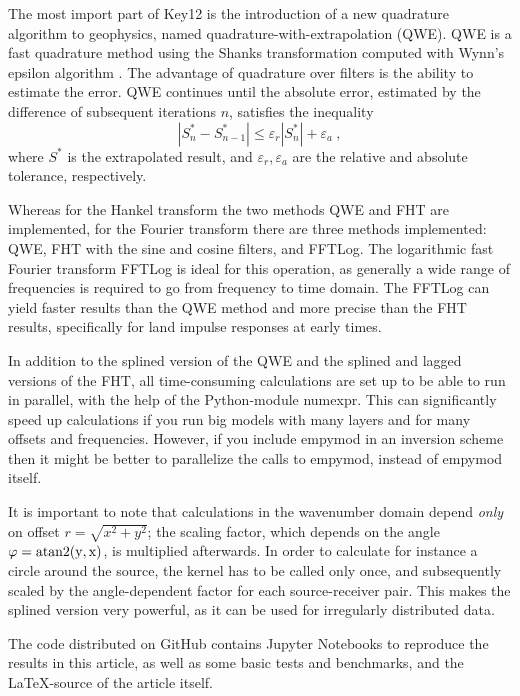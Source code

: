 \documentclass[manuscript]{geophysics}
\newcommand{\tnt}[1]{#1}
\newcommand{\python}{\tnt{Python}\xspace}
\newcommand{\empymod}{\tnt{empymod}\xspace}
\newcommand{\fftlog}{\tnt{FFTLog}\xspace}
\begin{document}
The most import part of Key12 is the introduction of a new quadrature algorithm
to geophysics, named qua\-dra\-ture-with-ex\-tra\-po\-la\-tion (QWE). QWE is a
fast quadrature method using the Shanks transformation \citep{JMP.55.Shanks}
computed with Wynn's epsilon algorithm \citep{MC.56.Wynn}. The advantage of
quadrature over filters is the ability to estimate the error. QWE continues
until the absolute error, estimated by the difference of subsequent iterations
$n$, satisfies the inequality
%
\begin{equation}
  |S^*_n-S^*_{n-1}| \le \varepsilon_r|S^*_n| + \varepsilon_a\ ,
  \label{eq:err}
\end{equation}
%
where $S^*$ is the extrapolated result, and $\varepsilon_r, \varepsilon_a$ are
the relative and absolute tolerance, respectively.

Whereas for the Hankel transform the two methods QWE and FHT are implemented,
for the Fourier transform there are three methods implemented: QWE, FHT with
the sine and cosine filters, and \fftlog \citep{RAS.00.Hamilton}. The
logarithmic fast Fourier transform \fftlog is ideal for this operation, as
generally a wide range of frequencies is required to go from frequency to time
domain. The \fftlog can yield faster results than the QWE method and more
precise than the FHT results, specifically for land impulse responses at early
times.

In addition to the splined version of the QWE and the splined and lagged
versions of the FHT, all time-consuming calculations are set up to be able to
run in parallel, with the help of the \python-module \tnt{numexpr}.  This can
significantly speed up calculations if you run big models with many layers and
for many offsets and frequencies. However, if you include \empymod in an
inversion scheme then it might be better to parallelize the calls to \empymod,
instead of \empymod itself.

It is important to note that calculations in the wavenumber domain depend
\emph{only} on offset $r = \sqrt{x^2+y^2}$; the scaling factor, which depends
on the angle $\varphi = \rm{atan2}(y, x)$, is multiplied afterwards. In order
to calculate for instance a circle around the source, the kernel has to be
called only once, and subsequently scaled by the angle-dependent factor for
each source-receiver pair. This makes the splined version very powerful, as it
can be used for irregularly distributed data.

The code distributed on GitHub contains \tnt{Jupyter Notebooks} to reproduce
the results in this article, as well as some basic tests and benchmarks, and
the \LaTeX-source of the article itself.
\end{document}
